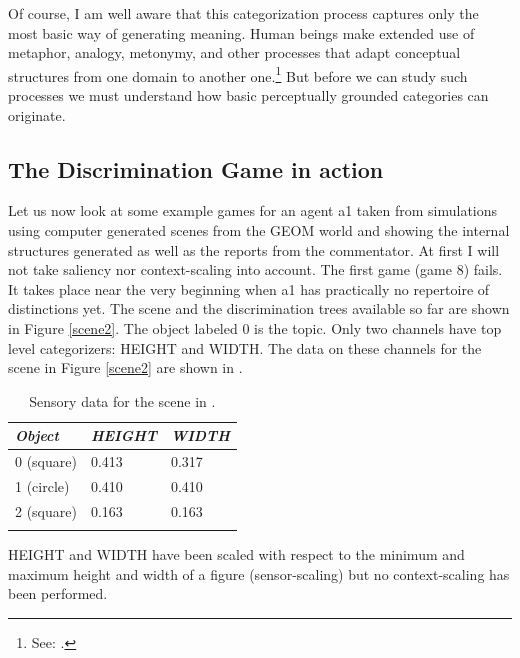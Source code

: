 Of course, I am well aware that this categorization 
process captures only the most basic way of generating
meaning. Human beings make extended use of metaphor, 
analogy, metonymy, and other processes that adapt 
conceptual structures from one domain to another one.\footnote{
See: \cite{Johnson:1987}.}
But before we can study such processes we must understand
how basic perceptually grounded categories can 
originate. 
 
\subsection{The Discrimination Game in action}

Let us now look at some example 
games for an agent {\bfshape a1} taken from simulations
using computer generated
scenes from the GEOM world and showing the internal
structures generated as well as the reports from the commentator. 
At first I will not take saliency nor 
context-scaling into account. The first game
(game 8) fails. It takes place near the very beginning 
when {\bfshape a1} has practically 
no repertoire of distinctions yet. The scene and the 
discrimination trees available so far are shown in Figure 
\ref{scene2}. The object labeled 0 is the
topic. Only two channels have top level
categorizers: HEIGHT and WIDTH. 
The data on these channels for the scene in Figure
\ref{scene2} are shown in . 

\begin{table}
\begin{center}
\begin{tabular}{ l  l  l }
\lsptoprule
{\itshape Object} & {\itshape HEIGHT} & {\itshape WIDTH} \\ \midrule
0 (square) & 0.413 & 0.317  \\ 
1 (circle) & 0.410 & 0.410 \\ 
2 (square) & 0.163 & 0.163 \\ 
\lspbottomrule
\end{tabular}
\caption{\label{tab:t-game8} Sensory data for the scene in .}
\end{center}
\end{table}

HEIGHT and WIDTH have been scaled with respect to the 
minimum and maximum height and width of a 
figure (sensor-scaling) but no context-scaling has 
been performed. 

